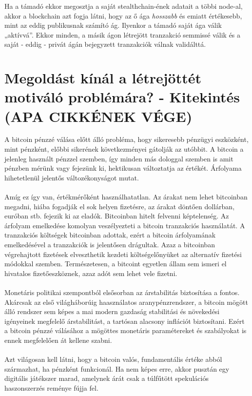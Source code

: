 \documentclass[11pt,a4paper]{article}
\newcommand{\q}[1]{„#1''} %
\begin{document}
\noindent Ha a támadó ekkor megosztja a saját stealthchain-ének adatait a többi node-al, akkor a blockchain azt fogja látni, hogy az ő ága \textit{hosszabb} és emiatt értékesebb, mint az eddig publikusnak számító ág. Ilyenkor a támadó saját ága válik \q{aktívvá}. Ekkor minden, a másik ágon létrejött tranzakció semmissé válik és a saját - eddig - privát ágán bejegyzett tranzakciók válnak validálttá.

\section{Megoldást kínál a létrejöttét motiváló problémára? - Kitekintés (APA CIKKÉNEK VÉGE)}
A bitcoin pénzzé válása előtt álló probléma, hogy sikeresebb pénzügyi eszközként, mint pénzként, előbbi sikerének következményei gátolják az utóbbit. A bitcoin a jelenleg használt pénzzel szemben, így minden más dologgal szemben is amit pénzben mérünk vagy fejezünk ki, hektikusan változtatja az értékét. Árfolyama hihetetlenül jelentős változékonyságot mutat. 
\\ \\
Amíg ez így van, értékmérőként használhatatlan. Az árakat nem lehet bitcoinban megadni, hiába fogadják el sok helyen fizetésre, az árakat döntően dollárban, euróban stb. fejezik ki az eladók. Bitcoinban hitelt felvenni képtelenség.  Az árfolyam emelkedése komolyan veszélyezteti a bitcoin tranzakciós használatát. A tranzakciós költségek bitcoinban adottak, ezért a bitcoin árfolyamának emelkedésével a tranzakciók is jelentősen drágultak. Azaz a bitcoinban végrehajtott fizetések elveszthetik kezdeti költségelőnyüket az alternatív fizetési módokkal szemben. Természetesen, a bitcoint egyetlen állam sem ismeri el hivatalos fizetőeszköznek, azaz adót sem lehet vele fizetni.
\\ \\
Monetáris politikai szempontból elsősorban az árstabilitás biztosítása a fontos. Akárcsak az első világháborúig haasználatos aranypénzrendszer, a bitcoin mögött álló rendszer sem képes a mai modern gazdaság stabilitási és növekedési igényeinek megfelelő árstabilitást, a tartósan alacsony inflációt biztosítani. Ezért a bitcoin pénzzé válásához a mögöttes monetáris paramétereket és szabályokat is ennek megfelelően át kellene szabni.
\\ \\
Azt világosan kell látni, hogy a bitcoin valós, fundamentális értéke abból származhat, ha pénzként funkcionál. Ha nem képes erre, akkor pusztán egy digitális játékszer marad, amelynek árát csak a túlfűtött spekulációs haszonszerzés reménye fújja fel. 
\end{document}
